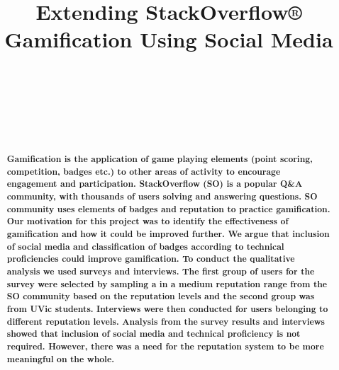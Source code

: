 \documentclass{sigchi}
\begin{document}
\title{Extending StackOverflow® Gamification Using Social Media}

\author{%
    \\
    \\
    \\
    \\
    \\
}

\maketitle

\begin{abstract}
\textbf{Gamification is the application of game playing elements (point scoring, competition, badges etc.) to other areas of activity to encourage engagement and participation. StackOverflow (SO) is a popular Q\&A community, with thousands of users solving and answering questions. SO community uses elements of badges and reputation to practice gamification.  Our motivation for this project was to identify the effectiveness of gamification and how it could be improved further. We argue that inclusion of social media and classification of badges according to technical proficiencies could improve gamification. To conduct the qualitative analysis we used surveys and interviews. The first group of users for the survey were selected by sampling a in a medium reputation range from the SO community based on the reputation levels and the second group was from UVic students. Interviews were then conducted for users belonging to different reputation levels. Analysis from the survey results and interviews showed that inclusion of social media and technical proficiency is not required. However, there was a need for the reputation system to be more meaningful on the whole.}
\end{abstract}
\end{document}

